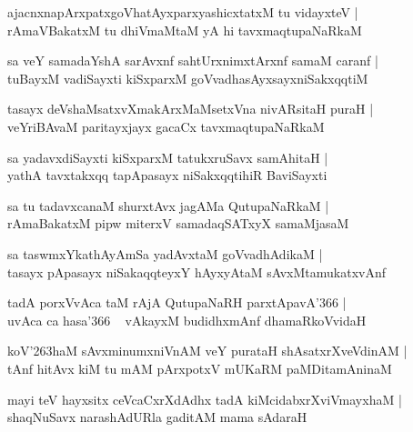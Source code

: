 \documentclass[twoside,12pt,openright]{book}
\def\S{\char'263}
\newcounter{shloka}[chapter]
\begin{document}
\begin{shloka}%
ajacnxnapArxpatxgoVhatAyxparxyashicxtatxM tu vidayxteV |\\
rAmaVBakatxM tu dhiVmaMtaM yA hi tavxmaqtupaNaRkaM 
\end{shloka}

\begin{shloka}%
sa veY samadaYshA sarAvxnf sahtUrxnimxtArxnf samaM caranf |\\
tuBayxM vadiSayxti kiSxparxM goVvadhasAyxsayxniSakxqqtiM 
\end{shloka}

\begin{shloka}%
tasayx deVshaMsatxvXmakArxMaMsetxVna nivARsitaH puraH |\\
veYriBAvaM paritayxjayx gacaCx tavxmaqtupaNaRkaM 
\end{shloka}

\begin{shloka}%
sa yadavxdiSayxti kiSxparxM tatukxruSavx samAhitaH |\\
yathA tavxtakxqq tapApasayx niSakxqqtihiR BaviSayxti
\end{shloka}

\begin{shloka}%
sa tu tadavxcanaM shurxtAvx jagAMa QutupaNaRkaM |\\
rAmaBakatxM pipw miterxV samadaqSATxyX samaMjasaM 
\end{shloka}

\begin{shloka}%
sa taswmxYkathAyAmSa yadAvxtaM goVvadhAdikaM |\\
tasayx pApasayx niSakaqqteyxY hAyxyAtaM sAvxMtamukatxvAnf 
\end{shloka}

\begin{shloka}%
tadA porxVvAca taM rAjA QutupaNaRH parxtApavA\char'366 |\\
uvAca ca hasa\char'366 ~ vAkayxM budidhxmAnf dhamaRkoVvidaH 
\end{shloka}

\begin{shloka}%
koV\S haM sAvxminumxniVnAM veY purataH shAsatxrXveVdinAM |\\
tAnf hitAvx kiM tu mAM pArxpotxV mUKaRM paMDitamAninaM 
\end{shloka}

\begin{shloka}%
mayi teV hayxsitx ceVcaCxrXdAdhx tadA kiMcidabxrXviVmayxhaM |\\
shaqNuSavx narashAdURla gaditAM mama sAdaraH 
\end{shloka}
\end{document}
